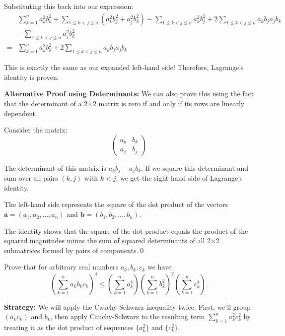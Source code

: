 Substituting this back into our expression:
\begin{align*}
&\sum_{k=1}^n a_k^2 b_k^2 + \sum_{1 \leq k < j \leq n} (a_k^2 b_j^2 + a_j^2 b_k^2) - \sum_{1 \leq k < j \leq n} a_k^2 b_j^2 + 2 \sum_{1 \leq k < j \leq n} a_k b_j a_j b_k  \\
&- \sum_{1 \leq k < j \leq n} a_j^2 b_k^2 \\
=& \sum_{k=1}^n a_k^2 b_k^2 + 2 \sum_{1 \leq k < j \leq n} a_k b_j a_j b_k
\end{align*}

This is exactly the same as our expanded left-hand side! Therefore, Lagrange's identity is proven.

\textbf{Alternative Proof using Determinants:}
We can also prove this using the fact that the determinant of a 2×2 matrix is zero if and only if its rows are linearly dependent.

Consider the matrix:
\[
\begin{pmatrix}
a_k & b_k \\
a_j & b_j
\end{pmatrix}
\]

The determinant of this matrix is $a_k b_j - a_j b_k$. If we square this determinant and sum over all pairs $(k,j)$ with $k < j$, we get the right-hand side of Lagrange's identity.

The left-hand side represents the square of the dot product of the vectors $\mathbf{a} = (a_1, a_2, \ldots, a_n)$ and $\mathbf{b} = (b_1, b_2, \ldots, b_n)$.

The identity shows that the square of the dot product equals the product of the squared magnitudes minus the sum of squared determinants of all 2×2 submatrices formed by pairs of components.\qed


\begin{problembox}
\begin{problemstatement}
Prove that for arbitrary real numbers \( a_k, b_k, c_k \) we have
\[
\left( \sum_{k=1}^n a_k b_k c_k \right)^4 \leq
\left( \sum_{k=1}^n a_k^4 \right)
\left( \sum_{k=1}^n b_k^2 \right)^2
\left( \sum_{k=1}^n c_k^4 \right).
\]
\end{problemstatement}
\end{problembox}

\noindent\textbf{Strategy:} We will apply the Cauchy-Schwarz inequality twice. First, we'll group $(a_k c_k)$ and $b_k$, then apply Cauchy-Schwarz to the resulting term $\sum_{k=1}^n a_k^2 c_k^2$ by treating it as the dot product of sequences $\{a_k^2\}$ and $\{c_k^2\}$.

